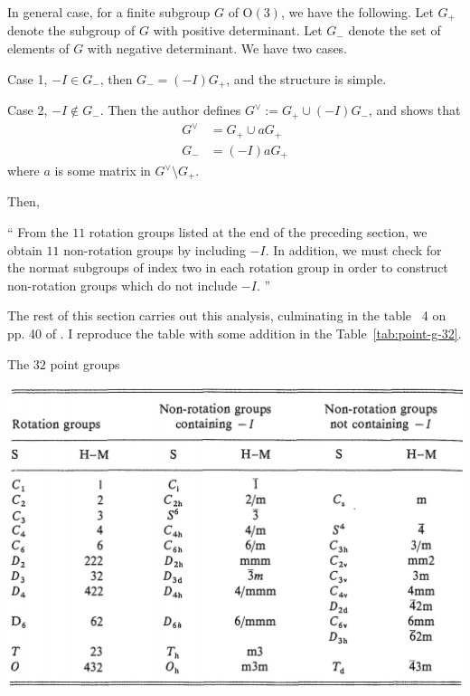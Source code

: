 \documentclass{article}
\begin{document}
    In general case, for a finite subgroup $G$ of $\mathrm{O}(3)$, we have the
    following. Let $G_+$ denote the subgroup of $G$ with positive determinant.
    Let $G_-$ denote the set of elements of $G$ with negative determinant. We
    have two cases.

    Case 1, $-I\in G_-$, then $G_-=(-I)G_+$, and the structure is simple.

    Case 2, $-I\notin G_-$. Then the author defines $G^\vee:=G_+\cup (-I)G_-$,
    and shows that 
    \begin{align}
        G^\vee &= G_+ \cup aG_+ \\
        G_- &= (-I)aG_+
    \end{align}
    where $a$ is some matrix in $G^\vee\setminus G_+$.

    Then,
    \begin{myquote} \enquote{
    From the $11$ rotation groups listed at the end of the preceding section, we
    obtain $11$ non-rotation groups by including $-I$. In addition, we must check for
    the normat subgroups of index two in each rotation group in order to
    construct non-rotation groups which do not include $-I$.
    } \end{myquote}

    The rest of this section carries out this analysis, culminating in the
    table~ 4 on pp. 40 of \cite{Sternberg1994}. I reproduce the table with some
    addition in the Table~\ref{tab:point-g-32}.

    \begin{table}[H]
        \centering
        \caption{The $32$ point groups}
        \label{tab:point-g-32}
        \includegraphics[width=1\linewidth]{pics/table4-32-point-group.png}
    \end{table}
\end{document}
